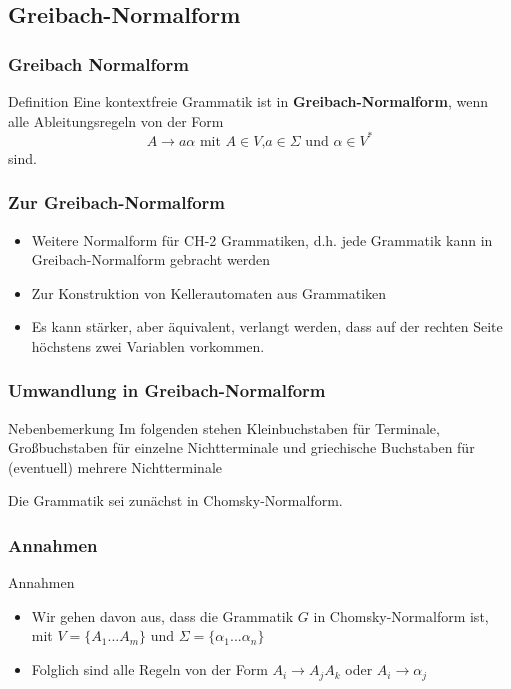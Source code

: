 \documentclass{beamer}
\begin{document}
{%
\subsection{Greibach-Normalform}
\begin{frame}
\frametitle{Greibach Normalform}
\begin{exampleblock}{Definition}
Eine kontextfreie Grammatik ist in \textbf{Greibach-Normalform}, wenn alle Ableitungsregeln von der Form 
$$ A \rightarrow a\alpha \text{ mit } A \in V\text{,} a\in \Sigma \text{ und } \alpha \in V^*$$
sind.
\end{exampleblock}
\end{frame}

\begin{frame}
\frametitle{Zur Greibach-Normalform}
\begin{itemize}
\item Weitere Normalform für CH-2 Grammatiken, d.h. jede Grammatik kann in Greibach-Normalform gebracht werden
\item Zur Konstruktion von Kellerautomaten aus Grammatiken
\item Es kann stärker, aber äquivalent, verlangt werden, dass auf der rechten Seite höchstens zwei Variablen vorkommen.
\end{itemize}
\end{frame}

\begin{frame}
\frametitle{Umwandlung in Greibach-Normalform}
\begin{exampleblock}{Nebenbemerkung}
Im folgenden stehen Kleinbuchstaben für Terminale, Großbuchstaben für einzelne Nichtterminale und griechische Buchstaben für (eventuell) mehrere Nichtterminale 
\end{exampleblock}
Die Grammatik sei zunächst in Chomsky-Normalform.
\end{frame}

\begin{frame}
\frametitle{Annahmen}
\begin{block}{Annahmen}
\begin{itemize}
 \item Wir gehen davon aus, dass die Grammatik $G$ in Chomsky-Normalform ist, mit $V = \{A_1 ... A_m \}$ und $\Sigma = \{\alpha_1 ... \alpha_n\}$
 \item Folglich sind alle Regeln von der Form $A_i \rightarrow A_jA_k$ oder $A_i \rightarrow \alpha_j$
\end{itemize}
\end{block}
\end{frame}

}
\end{document}

